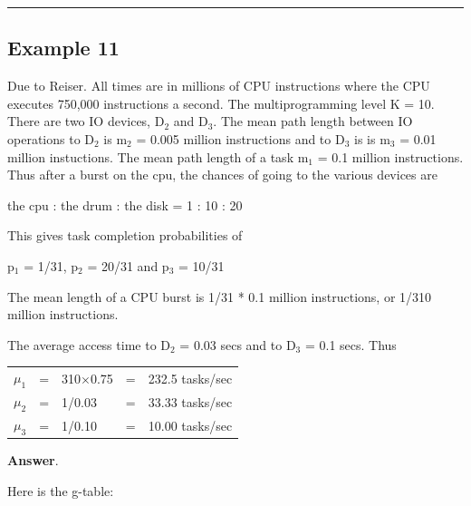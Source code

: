 \documentclass[12pt,fleqn]{report}
\begin{document}
\noindent
\hfill{\rule{160mm}{0.5mm}}

\subsection*{Example 11}

Due to Reiser.
All times are in millions of CPU instructions
where the CPU executes 750,000 instructions a second.
The multiprogramming level K = 10.
There are two IO devices, D$_2$ and D$_3$.
The mean path length between IO operations to D$_2$ is m$_2$ = 0.005
million instructions and to D$_3$ is is m$_3$ = 0.01 million instuctions.
The mean path length of a task m$_1$ = 0.1 million instructions.
Thus after a burst on the cpu, the chances of going to
the various devices are 

\begin{center}
the cpu : the drum : the disk = 1 : 10 : 20
\end{center}

This gives task completion probabilities of 

\begin{center}
p$_1$ = 1/31, p$_2$ = 20/31 and p$_3$ = 10/31
\end{center}


The mean length of a CPU burst is 1/31 * 0.1 million instructions,
or 1/310 million instructions.


The average access time to D$_2$ = 0.03 secs and to D$_3$ = 0.1 secs.
Thus

\begin{center}
\begin{tabular}{l c l c r}
$\mu_1$ & = & 310$\times$0.75 & = & 232.5 tasks/sec\\
$\mu_2$ & = & 1/0.03   & = & 33.33 tasks/sec\\
$\mu_3$ & = & 1/0.10 & = & 10.00 tasks/sec\\
\end{tabular}
\end{center}



\noindent
{\bf Answer}.


\noindent
Here is the g-table:
\end{document}
